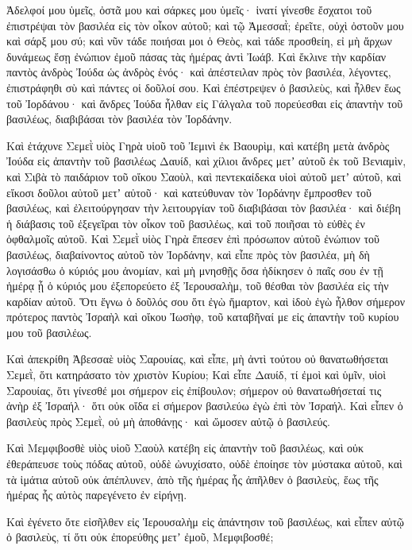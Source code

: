 {Ἀδελφοί μου ὑμεῖς, ὀστᾶ μου καὶ σάρκες μου ὑμεῖς· ἱνατί γίνεσθε ἔσχατοι τοῦ ἐπιστρέψαι τὸν βασιλέα εἰς τὸν οἶκον αὐτοῦ;
καὶ τῷ Ἀμεσσαῒ; ἐρεῖτε, οὐχὶ ὀστοῦν μου καὶ σάρξ μου σύ; καὶ νῦν τάδε ποιήσαι μοι ὁ Θεὸς, καὶ τάδε προσθείη, εἰ μὴ ἄρχων δυνάμεως ἔσῃ ἐνώπιον ἐμοῦ πάσας τὰς ἡμέρας ἀντὶ Ἰωάβ.
Καὶ ἔκλινε τὴν καρδίαν παντὸς ἀνδρὸς Ἰούδα ὡς ἀνδρὸς ἑνός· καὶ ἀπέστειλαν πρὸς τὸν βασιλέα, λέγοντες, ἐπιστράφηθι σὺ καὶ πάντες οἱ δοῦλοί σου.
Καὶ ἐπέστρεψεν ὁ βασιλεὺς, καὶ ἦλθεν ἕως τοῦ Ἰορδάνου· καὶ ἄνδρες Ἰούδα ἦλθαν εἰς Γάλγαλα τοῦ πορεύεσθαι εἰς ἀπαντὴν τοῦ βασιλέως, διαβιβάσαι τὸν βασιλέα τὸν Ἰορδάνην.
\par }{\PP {}Καὶ ἐτάχυνε Σεμεῒ υἱὸς Γηρὰ υἱοῦ τοῦ Ἰεμινὶ ἐκ Βαουρὶμ, καὶ κατέβη μετὰ ἀνδρὸς Ἰούδα εἰς ἀπαντὴν τοῦ βασιλέως Δαυίδ,
καὶ χίλιοι ἄνδρες μετʼ αὐτοῦ ἐκ τοῦ Βενιαμὶν, καὶ Σιβὰ τὸ παιδάριον τοῦ οἴκου Σαοὺλ, καὶ πεντεκαίδεκα υἱοὶ αὐτοῦ μετʼ αὐτοῦ, καὶ εἴκοσι δοῦλοι αὐτοῦ μετʼ αὐτοῦ· καὶ κατεύθυναν τὸν Ἰορδάνην ἔμπροσθεν τοῦ βασιλέως,
καὶ ἐλειτούργησαν τὴν λειτουργίαν τοῦ διαβιβάσαι τὸν βασιλέα· καὶ διέβη ἡ διάβασις τοῦ ἐξεγεῖραι τὸν οἶκον τοῦ βασιλέως, καὶ τοῦ ποιῆσαι τὸ εὐθὲς ἐν ὀφθαλμοῖς αὐτοῦ. Καὶ Σεμεῒ υἱὸς Γηρὰ ἔπεσεν ἐπὶ πρόσωπον αὐτοῦ ἐνώπιον τοῦ βασιλέως, διαβαίνοντος αὐτοῦ τὸν Ἰορδάνην,
καὶ εἶπε πρὸς τὸν βασιλέα, μὴ δὴ λογισάσθω ὁ κύριός μου ἀνομίαν, καὶ μὴ μνησθῇς ὅσα ἠδίκησεν ὁ παῖς σου ἐν τῇ ἡμέρᾳ ᾗ ὁ κύριός μου ἐξεπορεύετο ἐξ Ἰερουσαλὴμ, τοῦ θέσθαι τὸν βασιλέα εἰς τὴν καρδίαν αὐτοῦ.
Ὅτι ἔγνω ὁ δοῦλός σου ὅτι ἐγὼ ἥμαρτον, καὶ ἰδοὺ ἐγὼ ἦλθον σήμερον πρότερος παντὸς Ἰσραὴλ καὶ οἴκου Ἰωσὴφ, τοῦ καταβῆναί με εἰς ἀπαντὴν τοῦ κυρίου μου τοῦ βασιλέως.
\par }{\PP {}Καὶ ἀπεκρίθη Ἀβεσσαὲ υἱὸς Σαρουίας, καὶ εἶπε, μὴ ἀντὶ τούτου οὐ θανατωθήσεται Σεμεῒ, ὅτι κατηράσατο τὸν χριστὸν Κυρίου;
Καὶ εἶπε Δαυίδ, τί ἐμοὶ καὶ ὑμῖν, υἱοὶ Σαρουίας, ὅτι γίνεσθέ μοι σήμερον εἰς ἐπίβουλον; σήμερον οὐ θανατωθήσεταί τις ἀνὴρ ἐξ Ἰσραήλ· ὅτι οὐκ οἴδα εἰ σήμερον βασιλεύω ἐγὼ ἐπὶ τὸν Ἰσραήλ.
Καὶ εἶπεν ὁ βασιλεὺς πρὸς Σεμεῒ, οὐ μὴ ἀποθάνῃς· καὶ ὤμοσεν αὐτῷ ὁ βασιλεύς.
\par }{\PP {}Καὶ Μεμφιβοσθὲ υἱὸς υἱοῦ Σαοὺλ κατέβη εἰς ἀπαντὴν τοῦ βασιλέως, καὶ οὐκ ἐθεράπευσε τοὺς πόδας αὐτοῦ, οὐδὲ ὠνυχίσατο, οὐδὲ ἐποίησε τὸν μύστακα αὐτοῦ, καὶ τὰ ἱμάτια αὐτοῦ οὐκ ἀπέπλυνεν, ἀπὸ τῆς ἡμέρας ἧς ἀπῆλθεν ὁ βασιλεὺς, ἕως τῆς ἡμέρας ἧς αὐτὸς παρεγένετο ἐν εἰρήνῃ.
\par }{\PP {}Καὶ ἐγένετο ὅτε εἰσῆλθεν εἰς Ἱερουσαλὴμ εἰς ἀπάντησιν τοῦ βασιλέως, καὶ εἶπεν αὐτῷ ὁ βασιλεὺς, τί ὅτι οὐκ ἐπορεύθης μετʼ ἐμοῦ, Μεμφιβοσθέ;
}
